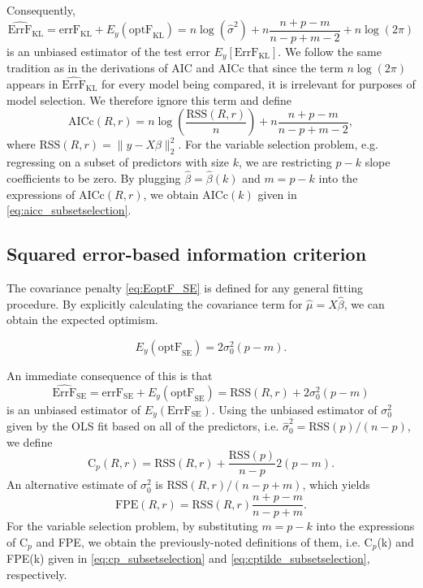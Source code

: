 Consequently, 
\begin{equation*}
\widehat{\text{ErrF}}_\text{KL} = \text{errF}_\text{KL} + E_y(\text{optF}_\text{KL}) = n\log(\hat\sigma^2) + n \frac{n+p-m}{n-p+m-2} + n\log(2\pi)
\end{equation*}
is an unbiased estimator of the test error $E_y \left[ \text{ErrF}_\text{KL} \right]$. We follow the same tradition as in the derivations of AIC and AICc that since the term $n\log(2\pi)$ appears in $\widehat{\text{ErrF}}_\text{KL}$ for every model being compared, it is irrelevant for purposes of model selection. We therefore ignore this term and define 
\begin{equation*}
 \text{AICc}(R,r) = n\log \left( \frac{\text{RSS}(R,r)}{n}  \right) + n \frac{n+p-m}{n-p+m-2},
\end{equation*}
where RSS$(R,r)= \lVert y -X\hat\beta \rVert_2^2$. For the variable selection problem, e.g. regressing on a subset of predictors with size $k$, we are restricting $p-k$ slope coefficients to be zero. By plugging $\hat\beta = \hat\beta(k)$ and $m=p-k$ into the expressions of AICc$(R,r)$, we obtain AICc$(k)$ given in \eqref{eq:aicc_subsetselection}.


\subsection{Squared error-based information criterion}
The covariance penalty \eqref{eq:EoptF_SE} is defined for any general fitting procedure. By explicitly calculating the covariance term for $\hat\mu=X\hat\beta$, we can obtain the expected optimism.
\begin{theorem}
\begin{equation*}
E_y (\text{optF}_\text{SE}) = 2 \sigma_0^2 (p-m).
\end{equation*}
\label{thm:EoptF_SE}
\end{theorem}

An immediate consequence of this is that
\begin{equation*}
\widehat{\text{ErrF}}_\text{SE} = \text{errF}_\text{SE} + E_y(\text{optF}_\text{SE}) = \text{RSS}(R,r) + 2 \sigma_0^2 (p-m)
\end{equation*}
is an unbiased estimator of $E_y(\text{ErrF}_\text{SE})$. Using the unbiased estimator of $\sigma_0^2$ given by the OLS fit based on all of the predictors, i.e. $\hat\sigma_0^2=\text{RSS}(p)/(n-p)$, we define
\begin{equation*}
\text{C}_p(R,r) = \text{RSS}(R,r) + \frac{\text{RSS}(p)}{n-p} 2(p-m).
\end{equation*}
An alternative estimate of $\sigma_0^2$ is $\text{RSS}(R,r)/(n-p+m)$, which yields 
\begin{equation*}
\text{FPE}(R,r) = \text{RSS}(R,r)\frac{n+p-m}{n-p+m}.
\end{equation*}
For the variable selection problem, by substituting $m=p-k$ into the expressions of C$_p$ and FPE, we obtain the previously-noted definitions of them, i.e. C$_p$(k) and FPE(k) given in \eqref{eq:cp_subsetselection} and \eqref{eq:cptilde_subsetselection}, respectively. 

